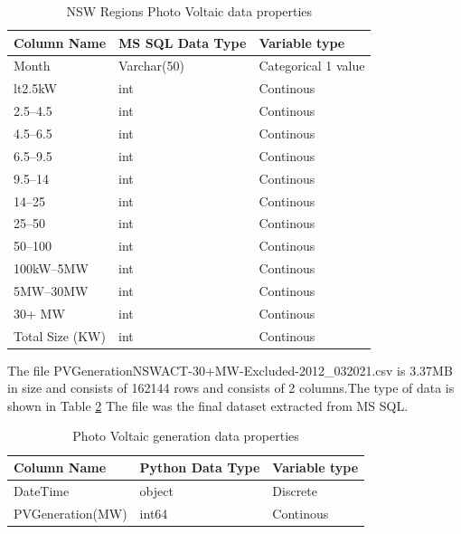 \documentclass[mstat,12pt]{unswthesis}
\begin{document}
\begin{table}[H]
\centering
\begin{tabular}{lll} 
\hline\hline
\textbf{Column Name} & \textbf{MS SQL Data Type} & \textbf{Variable type}  \\ 
\hline\hline
Month                            & Varchar(50)        & Categorical 1 value    \\
lt2.5kW                           &int          & Continous      \\
2.5–4.5                    &int          & Continous    \\
4.5–6.5              &int       & Continous      \\
6.5–9.5  &int       & Continous    \\
9.5–14                      &int      & Continous      \\
14–25                    &int          & Continous    \\
25–50              &int       & Continous      \\
50–100  &int       & Continous    \\
100kW–5MW                      &int      & Continous      \\
5MW–30MW              &int       & Continous      \\
30+ MW  &int       & Continous    \\
Total Size (KW)                      &int      & Continous      \\
\hline\hline
\end{tabular}
\caption{NSW Regions Photo Voltaic data properties}
\label{tab:pvInstall}
\end{table}

The file PVGenerationNSWACT-30+MW-Excluded-2012\_032021.csv is 3.37MB in
size and consists of 162144 rows and consists of 2 columns.The type of
data is shown in Table \ref{tab:pv} The file was the final dataset
extracted from MS SQL.

\begin{table}[H]
\centering
\begin{tabular}{lll} 
\hline\hline
\textbf{Column Name} & \textbf{Python Data Type} & \textbf{Variable type}  \\ 
\hline\hline
DateTime         & object           & Discrete    \\
PVGeneration(MW) & int64            & Continous      \\

\hline\hline
\end{tabular}
\caption{Photo Voltaic generation data properties}
\label{tab:pv}
\end{table}
\end{document}
